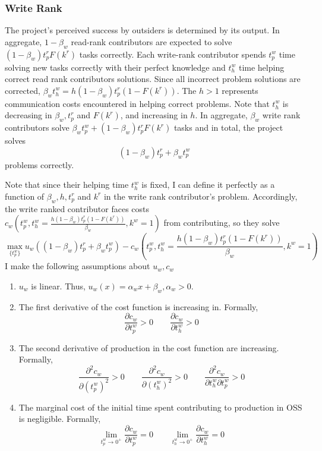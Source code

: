 \documentclass[source/paper/main.tex]{subfiles}
\begin{document}
\subsubsection{Write Rank}
The project's perceived success by outsiders is determined by its output. In aggregate, $1-\beta_w$ read-rank contributors are expected to solve $(1-\beta_w) t_p^rF(k^r)$ tasks correctly. Each write-rank contributor spends $t_p^w$ time solving new tasks correctly with their perfect knowledge and $t_h^w$ time helping correct read rank contributors solutions. Since all incorrect problem solutions are corrected, $\beta_w t_h^w = h (1-\beta_w) t_p^r(1-F(k^r))$. The $h>1$ represents communication costs encountered in helping correct problems. Note that $t_h^w$ is decreasing in $\beta_w, t_p^r$ and $F(k^r)$, and increasing in $h$. In aggregate, $\beta_w$ write rank contributors solve $\beta_w t_p^w + (1-\beta_w) t_p^rF(k^r)$ tasks and in total, the project solves
$$(1-\beta_w) t_p^r + \beta_w t_p^w $$
problems correctly.

\qquad Note that since their helping time $t_h^w$ is fixed, I can define it perfectly as a function of $\beta_w, h, t_p^r$ and $k^r$ in the write rank contributor's problem. Accordingly, the write ranked contributor faces costs $c_w\left(t_p^w, t_h^w = \frac{h (1-\beta_w) t_p^r(1-F(k^r))}{\beta_w}, k^w = 1\right)$ from contributing, so they solve
$$\max_{\{t_p^w\}} u_w\left((1-\beta_w) t_p^r + \beta_w t_p^w \right) - c_w\left(t_p^w, t_h^w = \frac{ h (1-\beta_w) t_p^r(1-F(k^r))}{\beta_w}, k^w = 1\right)$$
I make the following assumptions about $u_w, c_w$
\begin{enumerate}
    \item $u_w$ is linear. Thus, $u_w(x) = \alpha_wx + \beta_w, \alpha_w > 0$. 
    \item The first derivative of the cost function is increasing in. Formally, 
    $$\frac{\partial c_w}{\partial t_p^w}>0 \qquad \frac{\partial c_w}{\partial t_h^w}>0 $$   
    \item  The second derivative of production in the cost function are increasing. Formally, $$ \frac{\partial^2 c_w}{\partial (t_p^w)^2}>0 \qquad  \frac{\partial^2 c_w}{\partial (t_h^w)^2}>0 \qquad  \frac{\partial^2 c_w}{\partial t_h^w \partial t_p^w}>0$$
    \item The marginal cost of the initial time spent contributing to production in OSS is negligible. Formally,
    $$\lim_{t_p^w \to 0^+} \frac{\partial c_w}{\partial t_p^w} = 0 \qquad \lim_{t_h^w \to 0^+} \frac{\partial c_w}{\partial t_h^w} = 0$$
\end{enumerate}
\end{document}
